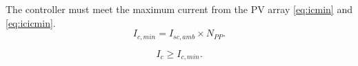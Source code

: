 \documentclass[journal]{IEEEtran}
\begin{document}
The controller must meet the maximum current from the PV array \eqref{eq:icmin} and \eqref{eq:icicmin}.
\begin{equation}
\label{eq:icmin}
I_{c,min} = I_{sc,amb} \times N_{PP}.
\end{equation}

\begin{equation}
\label{eq:icicmin}
I_{c} \geq I_{c,min}.
\end{equation}

%
%
%
%
\end{document}
